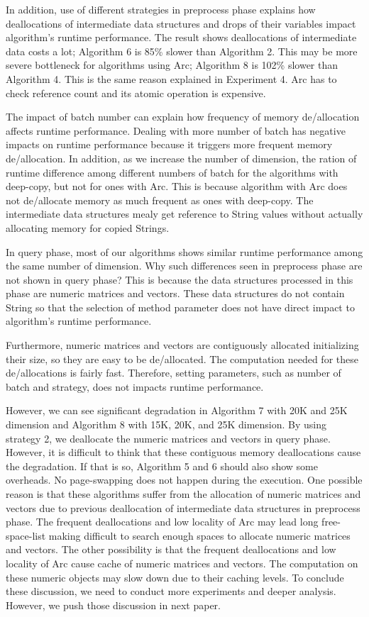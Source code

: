 In addition, use of different strategies in preprocess phase explains how deallocations of intermediate data structures and drops of their variables impact algorithm's runtime performance.
The result shows deallocations of intermediate data costs a lot; Algorithm 6 is 85\% slower than Algorithm 2.
This may be more severe bottleneck for algorithms using Arc; Algorithm 8 is 102\% slower than Algorithm 4.
This is the same reason explained in Experiment 4. 
Arc has to check reference count and its atomic operation is expensive. 

The impact of batch number can explain how frequency of memory de/allocation affects runtime performance. 
Dealing with more number of batch has negative impacts on runtime performance because it triggers more frequent memory de/allocation.
In addition, as we increase the number of dimension, the ration of runtime difference among different numbers of batch for the algorithms with deep-copy, but not for ones with Arc.
This is because algorithm with Arc does not de/allocate memory as much frequent as ones with deep-copy.
The intermediate data structures mealy get reference to String values without actually allocating memory for copied Strings.

In query phase, most of our algorithms shows similar runtime performance among the same number of dimension. 
Why such differences seen in preprocess phase are not shown in query phase? This is because the data structures processed in this phase are numeric matrices and vectors. 
These data structures do not contain String so that the selection of method parameter does not have direct impact to algorithm's runtime performance.

Furthermore, numeric matrices and vectors are contiguously allocated initializing their size, so they are easy to be de/allocated. 
The computation needed for these de/allocations is fairly fast. Therefore, setting parameters, such as number of batch and strategy, does not impacts runtime performance.

However, we can see significant degradation in Algorithm 7 with 20K and 25K dimension and Algorithm 8 with 15K, 20K, and 25K dimension. 
By using strategy 2, we deallocate the numeric matrices and vectors in query phase. However, it is difficult to think that these contiguous memory deallocations cause the degradation. 
If that is so, Algorithm 5 and 6 should also show some overheads. No page-swapping does not happen during the execution. 
One possible reason is that these algorithms suffer from the allocation of numeric matrices and vectors due to previous deallocation of intermediate data structures in preprocess phase. 
The frequent deallocations and low locality of Arc may lead long free-space-list making difficult to search enough spaces to allocate numeric matrices and vectors.
The other possibility is that the frequent deallocations and low locality of Arc cause cache of numeric matrices and vectors. 
The computation on these numeric objects may slow down due to their caching levels. 
To conclude these discussion, we need to conduct more experiments and deeper analysis. 
However, we push those discussion in next paper.

